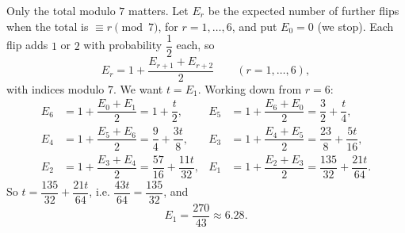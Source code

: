 Only the total modulo $7$ matters. Let $E_r$ be the expected number of further flips when the total is $\equiv r\pmod7$, for $r=1,\ldots,6$, and put $E_0=0$ (we stop). Each flip adds $1$ or $2$ with probability $\dfrac{1}{2}$ each, so
\[E_r=1+\dfrac{E_{r+1}+E_{r+2}}{2}\qquad(r=1,\ldots,6),\]
with indices modulo $7$. We want $t=E_1$. Working down from $r=6$:
\begin{align*}
E_6&=1+\dfrac{E_0+E_1}{2}=1+\dfrac {t}{2}, & E_5&=1+\dfrac{E_6+E_0}{2}=\dfrac{3}{2}+\dfrac {t}{4},\\
E_4&=1+\dfrac{E_5+E_6}{2}=\dfrac{9}{4}+\dfrac{3t}{8}, & E_3&=1+\dfrac{E_4+E_5}{2}=\dfrac{23}{8}+\dfrac{5t}{16},\\
E_2&=1+\dfrac{E_3+E_4}{2}=\dfrac{57}{16}+\dfrac{11t}{32}, & E_1&=1+\dfrac{E_2+E_3}{2}=\dfrac{135}{32}+\dfrac{21t}{64}.
\end{align*}
So $t=\dfrac{135}{32}+\dfrac{21t}{64}$, i.e. $\dfrac{43t}{64}=\dfrac{135}{32}$, and
\[E_1=\boxed{\dfrac{270}{43}}\approx6.28 .\]
